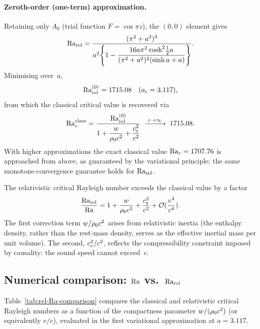 \paragraph{Zeroth-order (one-term) approximation.}
Retaining only $A_{0}$ (trial function $F = \cos\pi z$), the
$(0,0)$ element gives
\begin{equation}\label{eq:rel-2-311}
  \mathrm{Ra}_{\mathrm{rel}}
  = \frac{(\pi^{2}+a^{2})^{3}}
         {a^{2}\!\left\{
           1 - \dfrac{16a\pi^{2}\cosh^{2}\!\tfrac{1}{2}a}
                      {(\pi^{2}+a^{2})^{2}(\sinh a + a)}
         \right\}}.
\end{equation}
Minimising over~$a$,
\begin{equation}\label{eq:rel-Rac-0}
  \mathrm{Ra}_{\mathrm{rel}}^{(0)} = 1715.08 \quad (a_{c}=3.117),
\end{equation}
from which the classical critical value is recovered via
\begin{equation}\label{eq:rel-Rac-classical}
  \mathrm{Ra}_{c}^{\mathrm{class}}
  = \frac{\mathrm{Ra}_{\mathrm{rel}}^{(0)}}
         {\displaystyle 1
           + \frac{w}{\rho_0 c^{2}}
           + \frac{c_{\mathrm{s}}^{2}}{c^{2}}}
  \;\xrightarrow{\;c\to\infty\;}\;
  1715.08.
\end{equation}
With higher approximations the exact classical value
$\mathrm{Ra}_{c}=1707.76$ is approached from above, as guaranteed by the
variational principle; the same monotone-convergence guarantee holds
for $\mathrm{Ra}_{\mathrm{rel}}$.

\begin{relcorrection}
The relativistic critical Rayleigh number exceeds the classical value by
a factor
\begin{equation}\label{eq:rel-correction-factor}
  \frac{\mathrm{Ra}_{\mathrm{rel}}}{\mathrm{Ra}}
  = 1 + \frac{w}{\rho_0 c^{2}}
      + \frac{c_{\mathrm{s}}^{2}}{c^{2}}
      + \mathcal{O}(\frac{v^{4}}{c^{4}}).
\end{equation}
The first correction term $w/\rho_0 c^{2}$ arises from
relativistic inertia (the enthalpy density, rather than the rest-mass
density, serves as the effective inertial mass per unit volume).  The
second, $c_{\mathrm{s}}^{2}/c^{2}$, reflects the compressibility constraint
imposed by causality: the sound speed cannot exceed~$c$.
\end{relcorrection}

\subsection{Numerical comparison: $\mathrm{Ra}$ vs.\ $\mathrm{Ra}_{\mathrm{rel}}$}

Table~\ref{tab:rel-Ra-comparison} compares the classical and
relativistic critical Rayleigh numbers as a function of the
compactness parameter $w/(\rho_0 c^{2})$ (or equivalently
$v/c$), evaluated in the first variational approximation at
$a = 3.117$.

